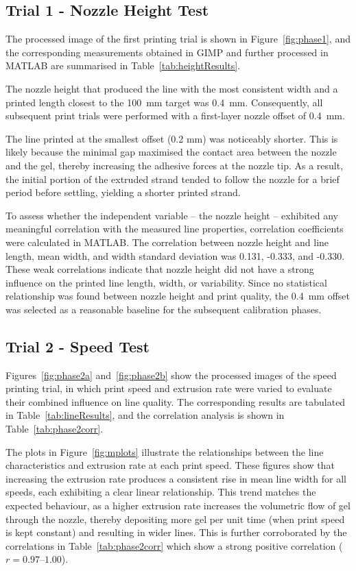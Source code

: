 \subsection*{Trial 1 - Nozzle Height Test}
The processed image of the first printing trial is shown in Figure~\ref{fig:phase1}, and the corresponding measurements obtained in GIMP and further processed in MATLAB are summarised in Table~\ref{tab:heightResults}. 

The nozzle height that produced the line with the most consistent width and a printed length closest to the 100~mm target was 0.4~mm. Consequently, all subsequent print trials were performed with a first-layer nozzle offset of 0.4~mm.

The line printed at the smallest offset (0.2 mm) was noticeably shorter. This is likely because the minimal gap maximised the contact area between the nozzle and the gel, thereby increasing the adhesive forces at the nozzle tip. As a result, the initial portion of the extruded strand tended to follow the nozzle for a brief period before settling, yielding a shorter printed strand.

To assess whether the independent variable -- the nozzle height -- exhibited any meaningful correlation with the measured line properties, correlation coefficients were calculated in MATLAB. The correlation between nozzle height and line length, mean width, and width standard deviation was 0.131, -0.333, and -0.330. These weak correlations indicate that nozzle height did not have a strong influence on the printed line length, width, or variability. Since no statistical relationship was found between nozzle height and print quality, the 0.4~mm offset was selected as a reasonable baseline for the subsequent calibration phases.

\subsection*{Trial 2 - Speed Test}
Figures~\ref{fig:phase2a} and~\ref{fig:phase2b} show the processed images of the speed printing trial, in which print speed and extrusion rate were varied to evaluate their combined influence on line quality. The corresponding results are tabulated in Table~\ref{tab:lineResults}, and the correlation analysis is shown in Table~\ref{tab:phase2corr}. 

The plots in Figure~\ref{fig:mplots} illustrate the relationships between the line characteristics and extrusion rate at each print speed. These figures show that increasing the extrusion rate produces a consistent rise in mean line width for all speeds, each exhibiting a clear linear relationship. This trend matches the expected behaviour, as a higher extrusion rate increases the volumetric flow of gel through the nozzle, thereby depositing more gel per unit time (when print speed is kept constant) and resulting in wider lines. This is further corroborated by the correlations in Table~\ref{tab:phase2corr} which show a strong positive correlation ($r = 0.97$–$1.00$).

